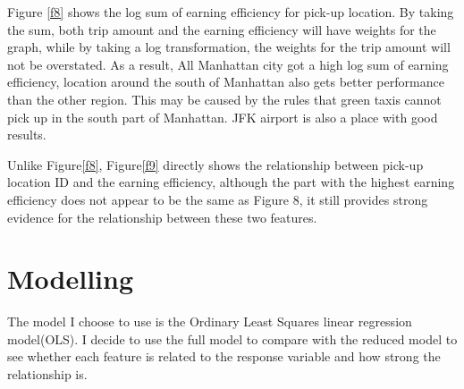 \documentclass[11pt]{article}
\begin{document}
Figure \ref{f8} shows the log sum of earning efficiency for pick-up location. By taking the sum, both trip amount and the earning efficiency will have weights for the graph, while by taking a log transformation, the weights for the trip amount will not be overstated. As a result, All Manhattan city got a high log sum of earning efficiency, location around the south of Manhattan also gets better performance than the other region. This may be caused by the rules that green taxis cannot pick up in the south part of Manhattan. JFK airport is also a place with good results.

Unlike Figure\ref{f8}, Figure\ref{f9} directly shows the relationship between pick-up location ID and the earning efficiency, although the part with the highest earning efficiency does not appear to be the same as Figure 8, it still provides strong evidence for the relationship between these two features.

\section{Modelling}
The model I choose to use is the Ordinary Least Squares linear regression model(OLS). I decide to use the full model to compare with the reduced model to see whether each feature is related to the response variable and how strong the relationship is.
\end{document}
